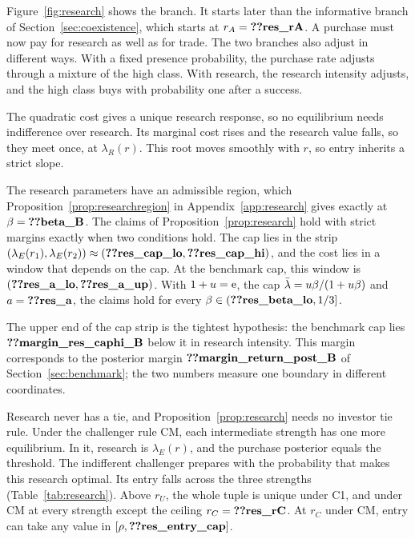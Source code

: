 Figure~\ref{fig:research} shows the branch. It starts later than the informative branch of
Section~\ref{sec:coexistence}, which starts at \(r_A=\reg{res_rA}\). A purchase must now pay for research as well
as for trade. The two branches also adjust in different ways. With a fixed presence probability, the purchase
rate adjusts through a mixture of the high class. With research, the research intensity adjusts, and the high class
buys with probability one after a success.

The quadratic cost gives a unique research response, so no equilibrium needs indifference over research. Its
marginal cost rises and the research value falls, so they meet once, at \(\lambda_R(r)\). This root moves smoothly
with \(r\), so entry inherits a strict slope.

The research parameters have an admissible region, which Proposition~\ref{prop:researchregion} in
Appendix~\ref{app:research} gives exactly at \(\beta=\reg{beta_B}\). The claims of Proposition~\ref{prop:research}
hold with strict margins exactly when two conditions hold. The cap lies in the strip
\((\lambda_E(r_1),\lambda_E(r_2))\approx(\reg{res_cap_lo},\reg{res_cap_hi})\), and the cost lies in a window that
depends on the cap. At the benchmark cap, this window is \((\reg{res_a_lo},\reg{res_a_up})\). With \(1+u=\mathrm{e}\), the cap
\(\bar\lambda=u\beta/(1+u\beta)\) and \(a=\reg{res_a}\), the claims hold for every \(\beta\in(\reg{res_beta_lo},1/3]\).

The upper end of the cap strip is the tightest hypothesis: the benchmark cap lies \(\reg{margin_res_caphi_B}\) below
it in research intensity. This margin corresponds to the posterior margin \(\reg{margin_return_post_B}\) of
Section~\ref{sec:benchmark}; the two numbers measure one boundary in different coordinates.

\begin{remark}\label{rem:researchties}
Research never has a tie, and Proposition~\ref{prop:research} needs no investor tie rule. Under the challenger rule CM,
each intermediate strength has one more equilibrium. In it, research is \(\lambda_E(r)\), and the purchase posterior
equals the threshold. The indifferent challenger prepares with the probability that makes this research optimal. Its
entry falls across the three strengths (Table~\ref{tab:research}). Above \(r_U\), the whole tuple is unique under C1,
and under CM at every strength except the ceiling \(r_C=\reg{res_rC}\). At \(r_C\) under CM, entry can take any value
in \([\rho,\reg{res_entry_cap}]\).
\end{remark}
